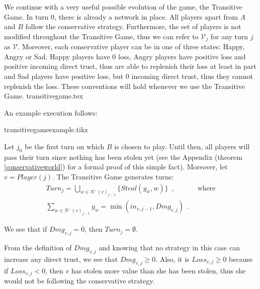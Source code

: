   We continue with a very useful possible evolution of the game, the Transitive Game. In turn 0, there is already a network
  in place. All players apart from $A$ and $B$ follow the conservative strategy. Furthermore, the set of players is not
  modified throughout the Transitive Game, thus we can refer to $\mathcal{V}_j$ for any turn $j$ as $\mathcal{V}$.
  Moreover, each conservative player can be in one of three states: Happy, Angry or Sad. Happy players have 0 loss, Angry
  players have positive loss and positive incoming direct trust, thus are able to replenish their loss at least in part and
  Sad players have positive loss, but 0 incoming direct trust, thus they cannot replenish the loss. These conventions will
  hold whenever we use the Transitive Game.
  {transitivegame.tex}

  \noindent An example execution follows:

  {transitivegameexample.tikz}

  \noindent Let $j_0$ be the first turn on which $B$ is chosen to play. Until then, all players will pass their turn since
  nothing has been stolen yet (see the Appendix (theorem \ref{conservativeworld}) for a formal proof of this simple fact).
  Moreover, let $v = Player(j)$. The Transitive Game generates turns:
  \begin{align}
     Turn_j = \bigcup\limits_{w \in N^{-}\left(v\right)_{j-1}}\{Steal\left(y_w,w\right)\} \enspace, & \mbox{ where} \\
     \sum\limits_{w \in N^{-}\left(v\right)_{j-1}}y_w = \min\left(in_{v, j-1}, Dmg_{v, j}\right) \enspace. &
  \end{align}
 
  \noindent We see that if $Dmg_{v, j} = 0$, then $Turn_j = \emptyset$.

  From the definition of $Dmg_{v,j}$ and knowing that no strategy in this case can increase any direct trust, we see
  that $Dmg_{v,j} \geq 0$. Also, it is $Loss_{v,j} \geq 0$ because if $Loss_{v,j} < 0$, then $v$ has
  stolen more value than she has been stolen, thus she would not be following the conservative strategy.
